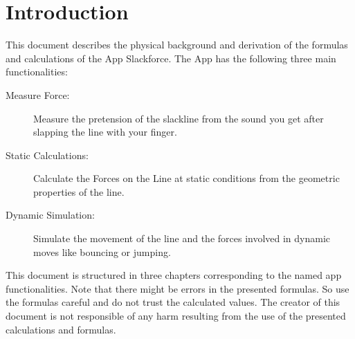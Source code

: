 \chapter{Introduction}

This document describes the physical background and derivation of the formulas and calculations of the App Slackforce. The App has the following three main functionalities:

\begin{description}
	\item[Measure Force:] Measure the pretension of the slackline from the sound you get after slapping the line with your finger.
	\item[Static Calculations:] Calculate the Forces on the Line at static conditions from the geometric properties of the line.
	\item[Dynamic Simulation:] Simulate the movement of the line and the forces involved in dynamic moves like bouncing or jumping.
\end{description}

This document is structured in three chapters corresponding to the named app functionalities. Note that there might be errors in the presented formulas. So use the formulas careful and do not trust the calculated values. The creator of this document is not responsible of any harm resulting from the use of the presented calculations and formulas.